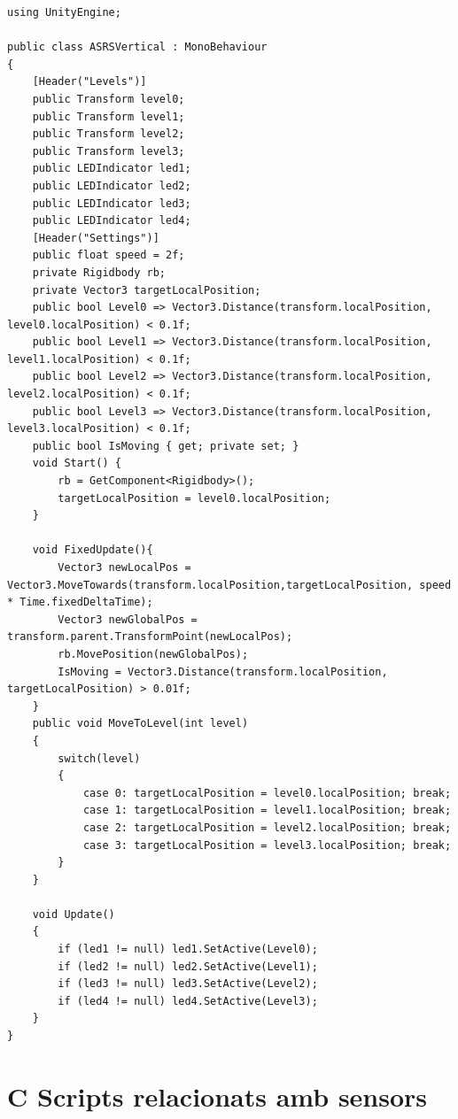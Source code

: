 \documentclass[a4paper,11pt,DIV=13,headings=normal,abstract=true,twoside=semi]{article}
\begin{document}
\begin{lstlisting}[style=modern, caption={Moviment vertical del transelevador}, label={lst:asrsvertical}]
using UnityEngine;

public class ASRSVertical : MonoBehaviour
{
    [Header("Levels")]
    public Transform level0;
    public Transform level1;
    public Transform level2;
    public Transform level3;
    public LEDIndicator led1;
    public LEDIndicator led2;
    public LEDIndicator led3;
    public LEDIndicator led4;
    [Header("Settings")]
    public float speed = 2f;
    private Rigidbody rb;
    private Vector3 targetLocalPosition;
    public bool Level0 => Vector3.Distance(transform.localPosition, level0.localPosition) < 0.1f;
    public bool Level1 => Vector3.Distance(transform.localPosition, level1.localPosition) < 0.1f;
    public bool Level2 => Vector3.Distance(transform.localPosition, level2.localPosition) < 0.1f;
    public bool Level3 => Vector3.Distance(transform.localPosition, level3.localPosition) < 0.1f;
    public bool IsMoving { get; private set; }
    void Start() {
        rb = GetComponent<Rigidbody>();
        targetLocalPosition = level0.localPosition; 
    }

    void FixedUpdate(){
        Vector3 newLocalPos = Vector3.MoveTowards(transform.localPosition,targetLocalPosition, speed * Time.fixedDeltaTime);
        Vector3 newGlobalPos = transform.parent.TransformPoint(newLocalPos);
        rb.MovePosition(newGlobalPos);
        IsMoving = Vector3.Distance(transform.localPosition, targetLocalPosition) > 0.01f;
    }
    public void MoveToLevel(int level)
    {
        switch(level)
        {
            case 0: targetLocalPosition = level0.localPosition; break;
            case 1: targetLocalPosition = level1.localPosition; break;
            case 2: targetLocalPosition = level2.localPosition; break;
            case 3: targetLocalPosition = level3.localPosition; break;
        }
    }

    void Update()
    {
        if (led1 != null) led1.SetActive(Level0);
        if (led2 != null) led2.SetActive(Level1);
        if (led3 != null) led3.SetActive(Level2);
        if (led4 != null) led4.SetActive(Level3);
    }
}
\end{lstlisting}

\section*{\textbf{C} Scripts relacionats amb sensors}
\end{document}
